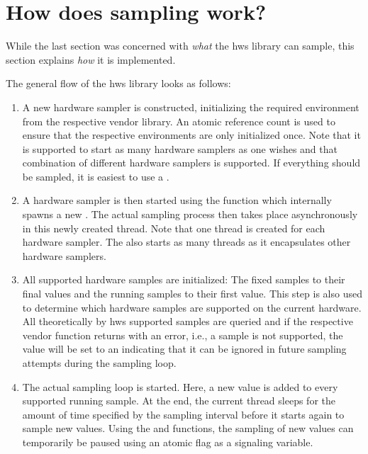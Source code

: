 \section{How does sampling work?}
\label{sec:hws_how}

While the last section was concerned with \textit{what} the hws library can sample, this section explains \textit{how} it is implemented. 



The general flow of the hws library looks as follows:
\begin{enumerate}
    \item%
    A new hardware sampler is constructed, initializing the required environment from the respective vendor library. 
    An atomic reference count is used to ensure that the respective environments are only initialized once. 
    Note that it is supported to start as many hardware samplers as one wishes and that combination of different hardware samplers is supported. 
    If everything should be sampled, it is easiest to use a .
    \item%
    A hardware sampler is then started using the  function which internally spawns a new . 
    The actual sampling process then takes place asynchronously in this newly created thread. 
    Note that one thread is created for each hardware sampler. 
    The  also starts as many threads as it encapsulates other hardware samplers. 
    \item%
    All supported hardware samples are initialized: The fixed samples to their final values and the running samples to their first value. 
    This step is also used to determine which hardware samples are supported on the current hardware. 
    All theoretically by hws supported samples are queried and if the respective vendor function returns with an error, i.e., a sample is not supported, the value will be set to an  indicating that it can be ignored in future sampling attempts during the sampling loop. 
    \item%
    The actual sampling loop is started. 
    Here, a new value is added to every supported running sample. 
    At the end, the current thread sleeps for the amount of time specified by the sampling interval before it starts again to sample new values. 
    Using the  and  functions, the sampling of new values can temporarily be paused using an atomic flag as a signaling variable. 

\end{enumerate}
